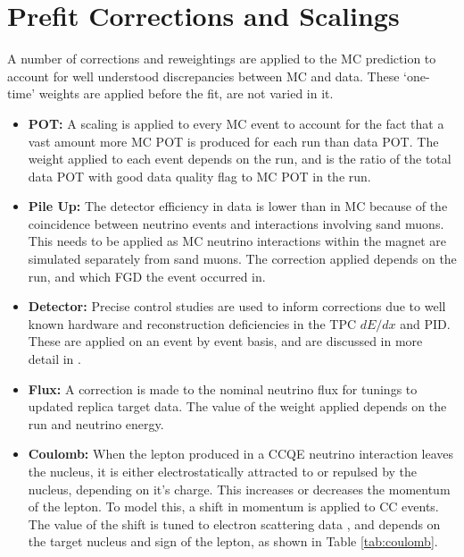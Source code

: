 \section{Prefit Corrections and Scalings}\label{sec:corr}

A number of corrections and reweightings are applied to the MC prediction to account for well understood discrepancies between MC and data. These `one-time' weights are applied before the fit, are not varied in it. 

\begin{itemize}

\item \textbf{POT: } A scaling is applied to every MC event to account for the fact that a vast amount more MC POT is produced for each run than data POT. The weight applied to each event depends on the run, and is the ratio of the total data POT with good data quality flag to MC POT in the run.

\item \textbf{Pile Up: } The detector efficiency in data is lower than in MC because of the coincidence between neutrino events and interactions involving sand muons. This needs to be applied as MC neutrino interactions within the magnet are simulated separately from sand muons. The correction applied depends on the run, and which FGD the event occurred in.

\item \textbf{Detector: } Precise control studies are used to inform corrections due to well known hardware and reconstruction deficiencies in the TPC $dE/dx$ and PID. These are applied on an event by event basis, and are discussed in more detail in \cite{tn212}.

\item \textbf{Flux: } A correction is made to the nominal neutrino flux for tunings to updated replica target data. The value of the weight applied depends on the run and neutrino energy.

\item \textbf{Coulomb: } When the lepton produced in a CCQE neutrino interaction leaves the nucleus, it is either electrostatically attracted to or repulsed by the nucleus, depending on it's charge. This increases or decreases the momentum of the lepton. To model this, a shift in momentum is applied to CC events. The value of the shift is tuned to electron scattering data \cite{coulombcorr}, and depends on the target nucleus and sign of the lepton, as shown in Table \ref{tab:coulomb}.


\end{itemize}
